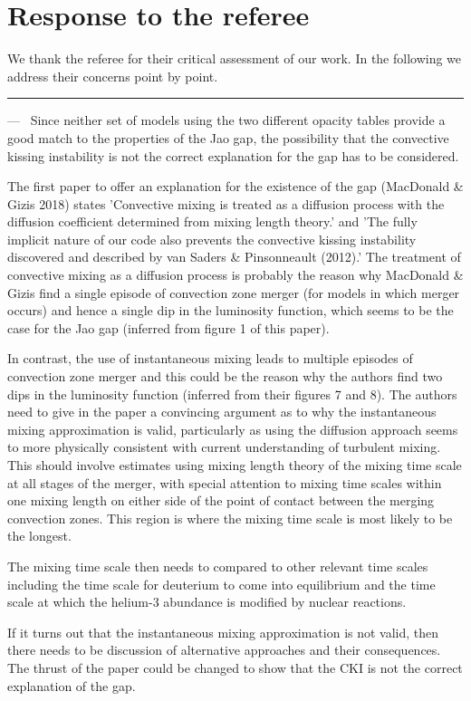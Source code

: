 \documentclass[11pt]{article}
\newcounter{reviewer}
\newcounter{point}[reviewer]
\renewcommand{\thepoint}{\arabic{point})}
\newenvironment{point}
   {\refstepcounter{point} \bigskip \noindent {\textbf{Referee~Point~\thepoint} } ---\ }
   {\par }
\begin{document}
\section*{Response to the referee}
We thank the referee for their critical assessment of our work. 
In the following we address their concerns point by point. 

\hrule
\begin{point}
	Since neither set of models using the two different opacity tables provide a
	good match to the properties of the Jao gap, the possibility that the
	convective kissing instability is not the correct explanation for the gap
	has to be considered.

	The first paper to offer an explanation for the existence of the gap (MacDonald
	\& Gizis 2018) states 'Convective mixing is treated as a diffusion process
	with the diffusion coefficient determined from mixing length theory.' and
	'The fully implicit nature of our code also prevents the convective kissing
	instability discovered and described by van Saders \& Pinsonneault (2012).'
	The treatment of convective mixing as a diffusion process is probably the
	reason why MacDonald \& Gizis find a single episode of convection zone
	merger (for models in which merger occurs) and hence a single dip in the
	luminosity function, which seems to be the case for the Jao gap (inferred
	from figure 1 of this paper).

	In contrast, the use of instantaneous mixing leads to multiple episodes of
	convection zone merger and this could be the reason why the authors find
	two dips in the luminosity function (inferred from their figures 7 and 8).
	The authors need to give in the paper a convincing argument as to why the
	instantaneous mixing approximation is valid, particularly as using the
	diffusion approach seems to more physically consistent with current
	understanding of turbulent mixing. This should involve estimates using
	mixing length theory of the mixing time scale at all stages of the merger,
	with special attention to mixing time scales within one mixing length on
	either side of the point of contact between the merging convection zones.
	This region is where the mixing time scale is most likely to be the
	longest.

	The mixing time scale then needs to compared to other relevant time scales
	including the time scale for deuterium to come into equilibrium and the
	time scale at which the helium-3 abundance is modified by nuclear
	reactions.

	If it turns out that the instantaneous mixing approximation is not valid, then
	there needs to be discussion of alternative approaches and their
	consequences. The thrust of the paper could be changed to show that the CKI
	is not the correct explanation of the gap.
\label{pt:timescale}
\end{point}
\end{document}
